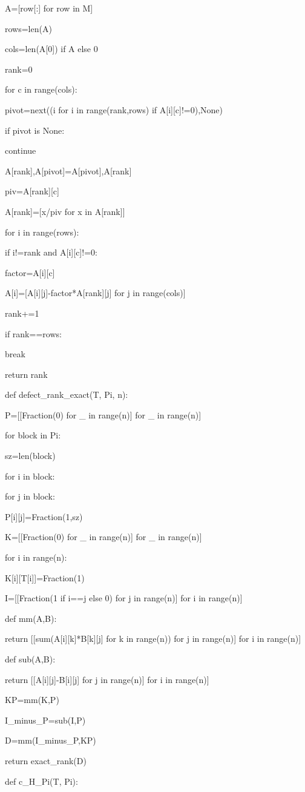 A=[row[:] for row in M]

rows=len(A)

cols=len(A[0]) if A else 0

rank=0

for c in range(cols):

pivot=next((i for i in range(rank,rows) if A[i][c]!=0),None)

if pivot is None:

continue

A[rank],A[pivot]=A[pivot],A[rank]

piv=A[rank][c]

A[rank]=[x/piv for x in A[rank]]

for i in range(rows):

if i!=rank and A[i][c]!=0:

factor=A[i][c]

A[i]=[A[i][j]-factor*A[rank][j] for j in range(cols)]

rank+=1

if rank==rows:

break

return rank


def defect_rank_exact(T, Pi, n):

P=[[Fraction(0) for _ in range(n)] for _ in range(n)]

for block in Pi:

sz=len(block)

for i in block:

for j in block:

P[i][j]=Fraction(1,sz)

K=[[Fraction(0) for _ in range(n)] for _ in range(n)]

for i in range(n):

K[i][T[i]]=Fraction(1)

I=[[Fraction(1 if i==j else 0) for j in range(n)] for i in range(n)]

def mm(A,B):

return [[sum(A[i][k]*B[k][j] for k in range(n)) for j in range(n)] for i in range(n)]

def sub(A,B):

return [[A[i][j]-B[i][j] for j in range(n)] for i in range(n)]

KP=mm(K,P)

I_minus_P=sub(I,P)

D=mm(I_minus_P,KP)

return exact_rank(D)


def c_H_Pi(T, Pi):

